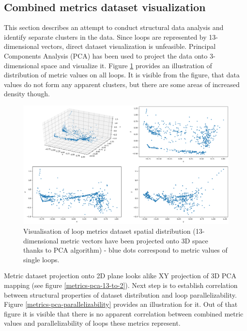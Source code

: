 \subsection{Combined metrics dataset visualization}
\label{analysis-data-clustering-analysis}
\qquad This section describes an attempt to conduct structural data analysis and identify separate clusters in the data. Since loops are represented by 13-dimensional vectors, direct dataset visualization is unfeasible. Principal Components Analysis (PCA) has been used to project the data onto 3-dimensional space and visualize it. Figure \ref{metrics-pca-13-to-3} provides an illustration of distribution of metric values on all loops. It is visible from the figure, that data values do not form any apparent clusters, but there are some areas of increased density though.
\begin{figure}[htb]
\centering
\includegraphics[width=\linewidth]{figs/metrics-pca-13-to-3.png}
\caption{Visualisation of loop metrics dataset spatial distribution (13-dimensional metric vectors have been projected onto 3D space thanks to PCA algorithm) - blue dots correspond to metric values of single loops.}
\label{metrics-pca-13-to-3}
\end{figure} \newline 
\null\qquad Metric dataset projection onto 2D plane looks alike XY projection of 3D PCA mapping (see figure \ref{metrics-pca-13-to-2}). \newline
\null\qquad Next step is to establish correlation between structural properties of dataset distribution and loop parallelizability. Figure \ref{metrics-pca-parallelizability} provides an illustration for it. Out of that figure it is visible that there is no apparent correlation between combined metric values and parallelizability of loops these metrics represent. 
